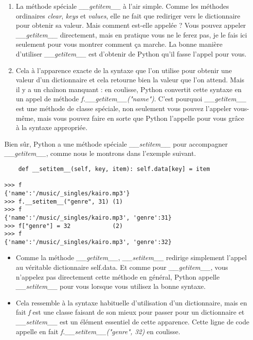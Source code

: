 \begin{enumerate}
\item La méthode spéciale \emph{\_\_getitem\_\_} à l'air simple. Comme les méthodes ordinaires \emph{clear}, \emph{keys} et \emph{values}, elle ne fait que rediriger vers le dictionnaire pour obtenir sa valeur. Mais comment est-elle appelée ? Vous pouvez appeler \emph{\_\_getitem\_\_} directement, mais en pratique vous ne le ferez pas, je le fais ici seulement pour vous montrer comment ça marche. La bonne manière d'utiliser \emph{\_\_getitem\_\_} est d'obtenir de Python qu'il fasse l'appel pour vous.
\item Cela à l'apparence exacte de la syntaxe que l'on utilise pour obtenir une valeur d'un dictionnaire et cela retourne bien la valeur que l'on attend. Mais il y a un chaînon manquant : en coulisse, Python convertit cette syntaxe en un appel de méthode \emph{f.\_\_getitem\_\_("name")}. C'est pourquoi \emph{\_\_getitem\_\_} est une méthode de classe spéciale, non seulement vous pouvez l'appeler vous-même, mais vous pouvez faire en sorte que Python l'appelle pour vous grâce à la syntaxe appropriée.
\end{enumerate}

\medskip
Bien sûr, Python a une méthode spéciale \emph{\_\_setitem\_\_} pour accompagner \emph{\_\_getitem\_\_}, comme nous le montrons dans l'exemple suivant.

\begin{example}
\begin{lstlisting}
    def __setitem__(self, key, item): self.data[key] = item

>>> f
{'name':'/music/_singles/kairo.mp3'}
>>> f.__setitem__("genre", 31) (1)
>>> f
{'name':'/music/_singles/kairo.mp3', 'genre':31}
>>> f["genre"] = 32            (2)
>>> f
{'name':'/music/_singles/kairo.mp3', 'genre':32}
\end{lstlisting}
\end{example}

\begin{itemize}
    \item Comme la méthode \emph{\_\_getitem\_\_}, \emph{\_\_setitem\_\_} redirige simplement l'appel au véritable dictionnaire self.data. Et comme pour \emph{\_\_getitem\_\_}, vous n'appelez pas directement cette méthode en général, Python appelle \emph{\_\_setitem\_\_} pour vous lorsque vous utilisez la bonne syntaxe.
    \item Cela ressemble à la syntaxe habituelle d'utilisation d'un dictionnaire, mais en fait \emph{f} est une classe faisant de son mieux pour passer pour un dictionnaire et \emph{\_\_setitem\_\_} est un élément essentiel de cette apparence. Cette ligne de code appelle en fait \emph{f.\_\_setitem\_\_("genre", 32)} en coulisse.
\end{itemize}

